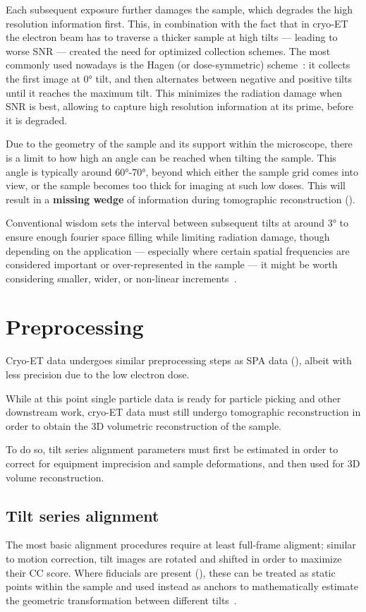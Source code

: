 Each subsequent exposure further damages the sample, which degrades the high resolution information first.
This, in combination with the fact that in cryo-ET the electron beam has to traverse a thicker sample at high tilts --- leading to worse SNR --- created the need for optimized collection schemes.
The most commonly used nowadays is the Hagen (or dose-symmetric)  scheme~\cite{hagenImplementationCryoelectronTomography2017}: it collects the first image at \ang{0} tilt, and then alternates between negative and positive tilts until it reaches the maximum tilt.
This minimizes the radiation damage when SNR is best, allowing to capture high resolution information at its prime, before it is degraded.

Due to the geometry of the sample and its support within the microscope, there is a limit to how high an angle can be reached when tilting the sample.
This angle is typically around \ang{60}-\ang{70}, beyond which either the sample grid comes into view, or the sample becomes too thick for imaging at such low doses.
This will result in a \textbf{missing wedge} of information during tomographic reconstruction ().

Conventional wisdom sets the interval between subsequent tilts at around \ang{3} to ensure enough fourier space filling while limiting radiation damage, though depending on the application --- especially where certain spatial frequencies are considered important or over-represented in the sample --- it might be worth considering smaller, wider, or non-linear increments~\cite{copeCryoElectronTomographyStructural2011}.

\section{Preprocessing}
Cryo-ET data undergoes similar preprocessing steps as SPA data (), albeit with less precision due to the low electron dose.

While at this point single particle data is ready for particle picking and other downstream work, cryo-ET data must still undergo tomographic reconstruction in order to obtain the 3D volumetric reconstruction of the sample.

To do so, tilt series alignment parameters must first be estimated in order to correct for equipment imprecision and sample deformations, and then used for 3D volume reconstruction.

\subsection{Tilt series alignment}\label{et_tilt_series_alignment}
The most basic alignment procedures require at least full-frame aligment; similar to motion correction, tilt images are rotated and shifted in order to maximize their CC score.
Where fiducials are present (), these can be treated as static points within the sample and used instead as anchors to mathematically estimate the geometric transformation between different tilts~\cite{nicastroMolecularArchitectureAxonemes2006,heumannClusteringVarianceMaps2011,castano-diezDynamoCatalogueGeometrical2017}.

